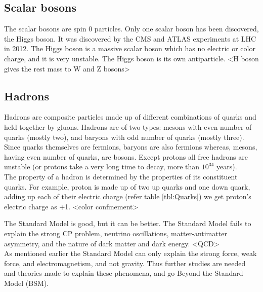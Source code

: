 \documentclass[12pt,a4paper,twoside]{report}
\begin{document}
\subsection{Scalar bosons}
The scalar bosons are spin 0 particles. Only one scalar boson has been discovered, the Higgs boson. It was discovered by the CMS and ATLAS experiments at LHC in 2012. The Higgs boson is a massive scalar boson which has no electric or color charge, and it is very unstable. The Higgs boson is its own antiparticle. <H boson gives the rest mass to W and Z bosons>
\subsection{Hadrons}
Hadrons are composite particles made up of different combinations of quarks and held together by gluons. Hadrons are of two types: mesons with even number of quarks (mostly two), and baryons with odd number of quarks (mostly three). Since quarks themselves are fermions, baryons are also fermions whereas, mesons, having even number of quarks, are bosons. Except protons all free hadrons are unstable (or protons take a very long time to decay, more than $10^{34}$ years).\\
The property of a hadron is determined by the properties of its constituent quarks. For example, proton is made up of two up quarks and one down quark, adding up each of their electric charge (refer table \ref{tbl:Quarks}) we get proton's electric charge as +1. <color confinement>
 
The Standard Model is good, but it can be better. The Standard Model fails to explain the strong CP problem, neutrino oscillations, matter-antimatter asymmetry, and the nature of dark matter and dark energy.%
<QCD>\\
As mentioned earlier the Standard Model can only explain the strong force, weak force, and electromagnetism, and not gravity. Thus further studies are needed and theories made to explain these phenomena, and go Beyond the Standard Model (BSM).\\
\end{document}
